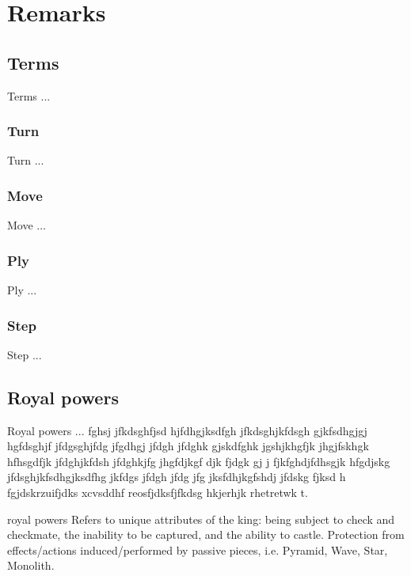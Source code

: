 
\chapter*{Remarks}

\section*{Terms}

Terms ...

\subsection*{Turn}
Turn ...

\subsection*{Move}
Move ...

\subsection*{Ply}
Ply ...

\subsection*{Step}
Step ...

\section*{Royal powers}

Royal powers ... fghsj jfkdsghfjsd hjfdhgjksdfgh jfkdsghjkfdsgh gjkfsdhgjgj
hgfdsghjf jfdgsghjfdg jfgdhgj jfdgh jfdghk gjskdfghk jgshjkhgfjk jhgjfskhgk
hfhsgdfjk jfdghjkfdsh jfdghkjfg jhgfdjkgf djk fjdgk gj j fjkfghdjfdhsgjk
hfgdjskg jfdsghjkfsdhgjksdfhg jkfdgs jfdgh jfdg jfg jksfdhjkgfshdj jfdskg
fjksd h fgjdskrzuifjdks xcvsddhf reosfjdksfjfkdsg hkjerhjk rhetretwk t.

royal powers
    Refers to unique attributes of the king: being subject to check and checkmate, the inability to be captured, and the ability to castle.
    Protection from effects/actions induced/performed by passive pieces, i.e. Pyramid, Wave, Star, Monolith.

